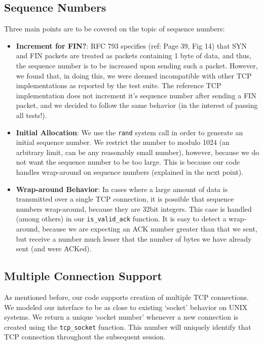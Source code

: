 \documentclass{article}
\begin{document}
\subsection{Sequence Numbers}
Three main points are to be covered on the topic of sequence numbers:

\begin{itemize}
\item \textbf{Increment for FIN?}: RFC 793 specifies (ref: Page 39, Fig 14) that SYN and FIN packets are treated as packets containing 1 byte of data, and thus, the sequence number is to be increased upon sending such a packet. However, we found that, in doing this, we were deemed incompatible with other TCP implementations as reported by the test suite. The reference TCP implementation does not increment it's sequence number after sending a FIN packet, and we decided to follow the same behavior (in the interest of passing all tests!).

\item \textbf{Initial Allocation}: We use the \texttt{rand} system call in order to generate an initial sequence number. We restrict the number to modulo 1024 (an arbitrary limit, can be any reasonably small number), however, because we do not want the sequence number to be too large. This is because our code handles wrap-around on sequence numbers (explained in the next point).

\item \textbf{Wrap-around Behavior}: In cases where a large amount of data is transmitted over a single TCP connection, it is possible that sequence numbers wrap-around, because they are 32bit integers. This case is handled (among others) in our \texttt{is\_valid\_ack} function. It is easy to detect a wrap-around, because we are expecting an ACK number greater than that we sent, but receive a number much lesser that the number of bytes we have already sent (and were ACKed).
\end{itemize}

\subsection{Multiple Connection Support}
As mentioned before, our code supports creation of multiple TCP connections. We modeled our interface to be as close to existing `socket' behavior on UNIX systems. We return a unique `socket number' whenever a new connection is created using the \texttt{tcp\_socket} function. This number will uniquely identify that TCP connection throughout the subsequent session.
\end{document}
